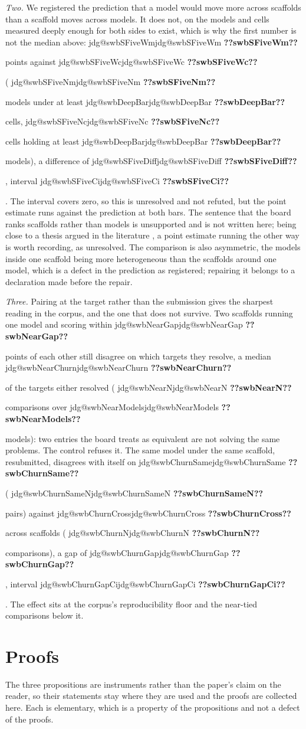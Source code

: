 \documentclass[11pt]{article}
\makeatletter
\newcommand{\jdg}[1]{%
  \ifcsname jdg@#1\endcsname\csname jdg@#1\endcsname
  \else\textbf{??#1??}\PackageError{rna}{undefined measured quantity #1}{}\fi}
\makeatother
\begin{document}
\emph{Two.} We registered the prediction that a model would move more across scaffolds than a
scaffold moves across models. It does not, on the models and cells measured deeply enough for both
sides to exist, which is why the first number is not the median above: \jdg{swbSFiveWm} points
against \jdg{swbSFiveWc} (\jdg{swbSFiveNm} models under at least \jdg{swbDeepBar} cells,
\jdg{swbSFiveNc} cells holding at least \jdg{swbDeepBar} models), a difference of
\jdg{swbSFiveDiff}, interval \jdg{swbSFiveCi}. The interval covers zero, so this is unresolved and
not refuted, but the point estimate runs against the prediction at both bars. The sentence that the
board ranks scaffolds rather than models is unsupported and is not written here; being close to a
thesis argued in the literature \citep{zhang2026harness}, a point estimate running the other way is
worth recording, as unresolved. The comparison is also asymmetric, the models inside one scaffold
being more heterogeneous than the scaffolds around one model, which is a defect in the prediction
as registered; repairing it belongs to a declaration made before the repair.

\emph{Three.} Pairing at the target rather than the submission gives the sharpest reading in the
corpus, and the one that does not survive. Two scaffolds running one model and scoring within
\jdg{swbNearGap} points of each other still disagree on which targets they resolve, a median
\jdg{swbNearChurn} of the targets either resolved (\jdg{swbNearN} comparisons over
\jdg{swbNearModels} models): two entries the board treats as equivalent are not solving the same
problems. The control refuses it. The same model under the same scaffold, resubmitted, disagrees
with itself on \jdg{swbChurnSame} (\jdg{swbChurnSameN} pairs) against \jdg{swbChurnCross} across
scaffolds (\jdg{swbChurnN} comparisons), a gap of \jdg{swbChurnGap}, interval \jdg{swbChurnGapCi}.
The effect sits at the corpus's reproducibility floor and the near-tied comparisons below it.


\section{Proofs}
\label{app:proofs}

The three propositions are instruments rather than the paper's claim on the reader, so their
statements stay where they are used and the proofs are collected here. Each is elementary, which is
a property of the propositions and not a defect of the proofs.
\end{document}
